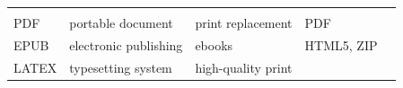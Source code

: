 \documentclass[10pt,fleqn]{wlpeerj}
\begin{document}
\begin{longtable}[]{@{}lllll@{}}
&
\begin{minipage}[t]{0.41\columnwidth}\raggedright\strut
\citep{ODF}
\strut\end{minipage}\tabularnewline
\begin{minipage}[t]{0.06\columnwidth}\raggedright\strut
PDF
\strut\end{minipage}
&
\begin{minipage}[t]{0.15\columnwidth}\raggedright\strut
portable
document
\strut\end{minipage}
&
\begin{minipage}[t]{0.13\columnwidth}\raggedright\strut
print
replacement
\strut\end{minipage}
&
\begin{minipage}[t]{0.10\columnwidth}\raggedright\strut
PDF
\strut\end{minipage}
&
\begin{minipage}[t]{0.41\columnwidth}\raggedright\strut
\citep{international_organization_for_standardization_iso_2013}
\strut\end{minipage}\tabularnewline
\begin{minipage}[t]{0.06\columnwidth}\raggedright\strut
EPUB
\strut\end{minipage}
&
\begin{minipage}[t]{0.15\columnwidth}\raggedright\strut
electronic
publishing
\strut\end{minipage}
&
\begin{minipage}[t]{0.13\columnwidth}\raggedright\strut
ebooks
\strut\end{minipage}
&
\begin{minipage}[t]{0.10\columnwidth}\raggedright\strut
HTML5,
ZIP
\strut\end{minipage}
&
\begin{minipage}[t]{0.41\columnwidth}\raggedright\strut
\citep{eikebrokk_epub_2014}
\strut\end{minipage}\tabularnewline
\begin{minipage}[t]{0.06\columnwidth}\raggedright\strut
LATEX
\strut\end{minipage}
&
\begin{minipage}[t]{0.15\columnwidth}\raggedright\strut
typesetting
system
\strut\end{minipage}
&
\begin{minipage}[t]{0.13\columnwidth}\raggedright\strut
high-quality
print
\strut\end{minipage}
&
\begin{minipage}[t]{0.10\columnwidth}\raggedright\strut

\end{minipage}
\end{longtable}
\end{document}

